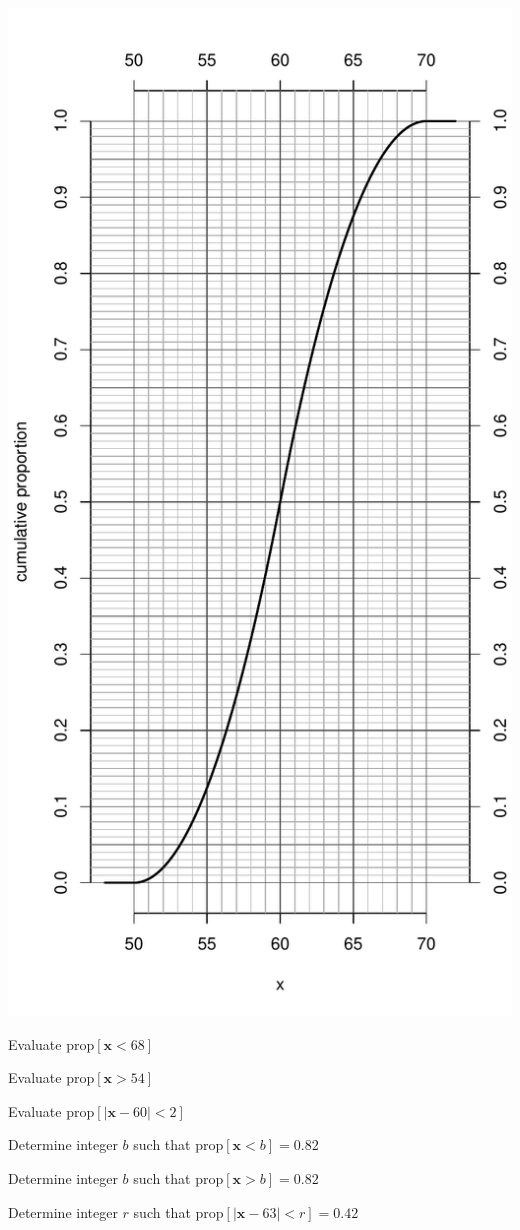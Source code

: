 \begin{question}
\includegraphics{unnamed-chunk-3-1.pdf}\\
\begin{answerlist}
  \item Evaluate \(\text{prop}[\mathbf{x}<68]\)
  \item Evaluate \(\text{prop}[\mathbf{x}>54]\)
  \item Evaluate \(\text{prop}[|\mathbf{x}-60|<2]\)
  \item Determine integer \(b\) such that \(\text{prop}[\mathbf{x}<b]=0.82\)
  \item Determine integer \(b\) such that \(\text{prop}[\mathbf{x}>b]=0.82\)
  \item Determine integer \(r\) such that
\(\text{prop}[|\mathbf{x}-63|<r]=0.42\)
\end{answerlist}
\end{question}

